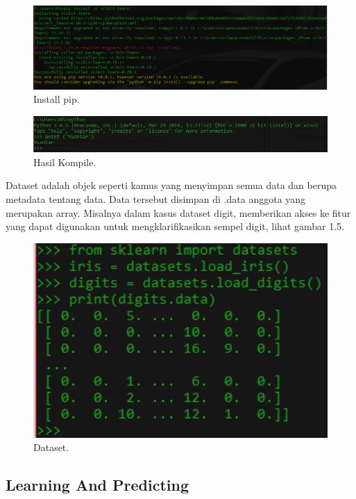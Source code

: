 \begin{enumerate}
\begin{figure}[ht]
\centerline{\includegraphics[width=1\textwidth]{figures/33.PNG}}
\caption{Install pip.}
\end{figure}

\begin{figure}[ht]
\centerline{\includegraphics[width=1\textwidth]{figures/35.PNG}}
\caption{Hasil Kompile.}
\end{figure}

\subitem
Dataset adalah objek seperti kamus yang menyimpan semua data dan berupa metadata tentang data. Data tersebut disimpan di .data anggota yang merupakan array. Misalnya dalam kasus dataset digit, memberikan akses ke fitur yang dapat digunakan untuk mengklarifikasikan sempel digit, lihat gambar 1.5.

\begin{figure}[ht]
\centerline{\includegraphics[width=1\textwidth]{figures/36.PNG}}
\caption{Dataset.}
\end{figure}

\subsection{Learning And Predicting}
\begin{verbatim}


\end{verbatim}
\end{enumerate}
